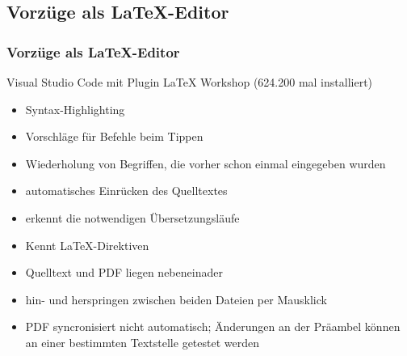 \documentclass[t, %
							xcolor=dvipsnames,%
							hyperref={bookmarks,colorlinks},%
							]%
							{beamer}
\begin{document}
		\subsection{Vorzüge als \LaTeX-Editor}
		\label{sub:VorzuegeLaTeXEditor}
		\begin{frame}
			\frametitle{Vorzüge als \LaTeX-Editor}
			Visual Studio Code mit Plugin LaTeX Workshop (624.200 mal installiert)
			\begin{itemize}
				\item Syntax-Highlighting
				\item Vorschläge für Befehle beim Tippen
				\item Wiederholung von Begriffen, die vorher schon einmal eingegeben wurden
				\item automatisches Einrücken des Quelltextes
				\item erkennt die notwendigen Übersetzungsläufe
				\item Kennt LaTeX-Direktiven
				\item Quelltext und PDF liegen nebeneinader
				\item hin- und herspringen zwischen beiden Dateien per Mausklick
				\item PDF syncronisiert nicht automatisch; Änderungen an der Präambel können an einer bestimmten Textstelle getestet werden  
			\end{itemize}
		\end{frame}
\end{document}
